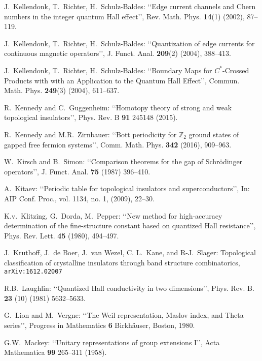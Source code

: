 \documentclass[11pt]{article}
\newcommand{\integer}{{\mathbb Z}}
\begin{document}
\begin{thebibliography}{99}
J.\ Kellendonk, T.\ Richter,  H.\ Schulz-Baldes: \lq\lq Edge current channels and Chern numbers in the integer quantum Hall effect\rq\rq, Rev. Math. Phys. {\bf 14}(1)  (2002), 87--119.

J.\ Kellendonk, T.\ Richter,  H.\ Schulz-Baldes: \lq\lq Quantization of edge currents for continuous magnetic operators\rq\rq, J. Funct. Anal. {\bf 209}(2) (2004), 388--413.

J.\ Kellendonk, T.\ Richter,  H.\ Schulz-Baldes: \lq\lq  Boundary Maps for $C^*$-Crossed Products with with an Application to the Quantum Hall Effect\rq\rq, Commun. Math. Phys. {\bf 249}(3) (2004), 611--637.

R.\  Kennedy and C.\  Guggenheim: \lq\lq Homotopy theory of strong and weak topological insulators\rq\rq, Phys. Rev. B {\bf 91} 245148 (2015).

R.\ Kennedy and M.R.\  Zirnbauer: \lq\lq Bott periodicity for $\integer_2$ ground states of gapped free fermion systems\rq\rq, Comm. Math. Phys. {\bf 342} (2016), 909--963.

W.\  Kirsch and B.\  Simon: \lq\lq Comparison theorems for the gap of Schr\"odinger operators\rq\rq, J. Funct. Anal. {\bf 75} (1987) 396--410.

A.\ Kitaev: \lq\lq Periodic table for topological insulators and superconductors\rq\rq, In: AIP Conf. Proc., vol. 1134, no. 1, (2009),  22--30.

K.v.\  Klitzing, G.\ Dorda, M.\ Pepper: \lq\lq New method for high-accuracy determination of the fine-structure constant based on quantized Hall resistance\rq\rq,  
Phys. Rev. Lett. {\bf 45}  (1980), 494--497.


J.\  Kruthoff, J.\ de Boer, J.\ van Wezel, C. L.\ Kane, and R-J.\ Slager:
Topological classification of crystalline insulators through band structure combinatorics, {\tt arXiv:1612.02007}


R.B.\ Laughlin:  \lq\lq Quantized Hall conductivity in two dimensions\rq\rq,  Phys. Rev. B. {\bf 23} (10) (1981) 5632--5633.

G.\ Lion and M.\ Vergne: \lq\lq The Weil representation, Maslov index, and Theta series\rq\rq, Progress in Mathematics {\bf 6}
Birkh\"auser, Boston, 1980.  

G.W.\ Mackey: \lq\lq Unitary representations of group extensions I\rq\rq,  Acta Mathematica {\bf 99} 265--311 (1958).



\end{thebibliography}
\end{document}
